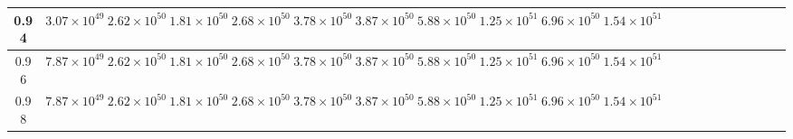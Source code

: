 \begin{table*}
\begin{tabular}{ccccccccccccccccccccc}
\hline
0.94  &$3.07\times 10^{49}$ &$2.62\times 10^{50}$ &$1.81\times 10^{50}$ &$2.68\times 10^{50}$ &$3.78\times 10^{50}$ &$3.87\times 10^{50}$ &$5.88\times 10^{50}$ &$1.25\times 10^{51}$ &$6.96\times 10^{50}$ &$1.54\times 10^{51}$ \\
\hline
0.96  &$7.87\times 10^{49}$ &$2.62\times 10^{50}$ &$1.81\times 10^{50}$ &$2.68\times 10^{50}$ &$3.78\times 10^{50}$ &$3.87\times 10^{50}$ &$5.88\times 10^{50}$ &$1.25\times 10^{51}$ &$6.96\times 10^{50}$ &$1.54\times 10^{51}$ \\
\hline
0.98  &$7.87\times 10^{49}$ &$2.62\times 10^{50}$ &$1.81\times 10^{50}$ &$2.68\times 10^{50}$ &$3.78\times 10^{50}$ &$3.87\times 10^{50}$ &$5.88\times 10^{50}$ &$1.25\times 10^{51}$ &$6.96\times 10^{50}$ &$1.54\times 10^{51}$ \\
\hline
\hline
\end{tabular}
\end{table*}
